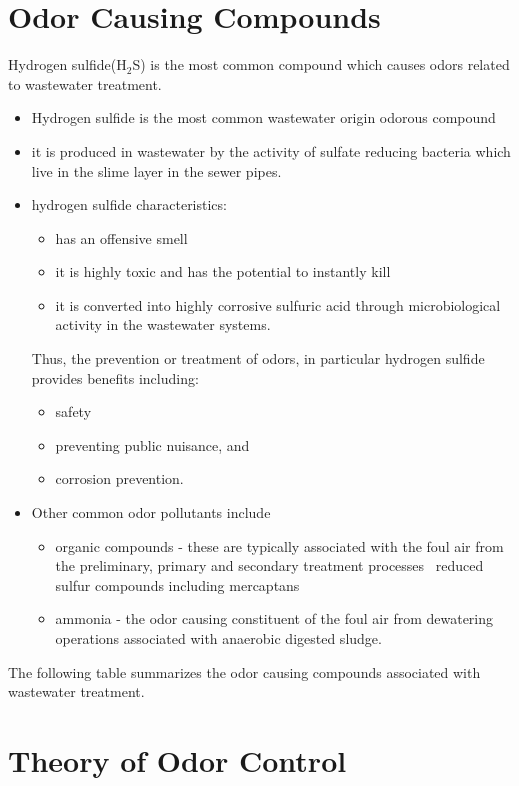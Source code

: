 \section{Odor Causing Compounds}
Hydrogen sulfide(H$_2$S) is the most common compound which causes odors related to wastewater treatment.  
\begin{itemize}
	\item Hydrogen sulfide is the most common wastewater origin odorous compound
	\item it is produced in wastewater by the activity of sulfate reducing bacteria which live in the slime layer in the sewer pipes.  
	\item hydrogen sulfide characteristics:
	\begin{itemize}
		\item has an offensive smell
		\item it is highly toxic and has the potential to instantly kill  
		\item it is converted into highly corrosive sulfuric acid through microbiological activity in the wastewater systems.  
	\end{itemize}
Thus, the prevention or treatment of odors, in particular hydrogen sulfide provides benefits including:
	\begin{itemize}
		\item safety
		\item preventing public nuisance, and
		\item  corrosion prevention.\\
	\end{itemize}
\vspace{0.5cm}
\item Other common odor pollutants include
\begin{itemize}
\item organic compounds - these are typically associated with the foul air from the preliminary, primary and secondary treatment processes
\ reduced sulfur compounds including mercaptans
\item ammonia - the odor causing constituent of the foul air from dewatering operations associated with anaerobic digested sludge.\\
\end{itemize}
\end{itemize}
The following table summarizes the odor causing compounds associated with wastewater treatment.\\
\afterpage{\clearpage}
\section{Theory of Odor Control}


